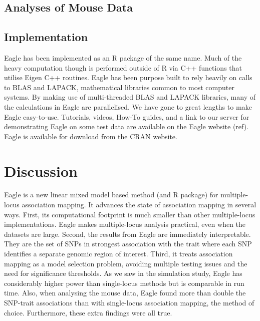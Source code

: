\documentclass{article}
\begin{document}
\subsection{Analyses of Mouse Data}




\subsection{Implementation}

Eagle has been implemented as an R package of the same name. Much of the heavy computation though is performed outside of R 
via C++ functions that utilise Eigen C++ routines. Eagle has been purpose built to rely heavily on calls to BLAS and LAPACK, 
mathematical libraries common to most computer systems. By making use of multi-threaded  BLAS and LAPACK libraries, many of the 
calculations in Eagle are parallelised. We have gone to great lengths to make Eagle easy-to-use. Tutorials, videos, How-To guides, and 
a link to our server for demonstrating Eagle on some test data are available on the Eagle website (ref).  
Eagle is available for download from the CRAN website. 

  
  
\section{Discussion}
Eagle is a new linear mixed model based method (and R package) for multiple-locus association mapping. It advances the state of association mapping in several ways. 
First, its computational footprint is much smaller than other multiple-locus implementations. Eagle makes multiple-locus analysis 
practical, even when the datasets are large. Second, the results from
 Eagle are immediately interpretable. They are the set of SNPs in strongest association with the trait where 
each SNP identifies a separate genomic region of interest. Third, it treats association mapping as a model selection problem, avoiding 
multiple testing issues and the need for significance thresholds. 
 As we saw in the simulation study, Eagle has considerably higher power than single-locus methods but is comparable in run time.
Also, when analysing the mouse data, Eagle found more than double the SNP-trait associations than 
with single-locus association mapping, the method of choice. Furthermore, these extra findings were all true. 
\end{document}
